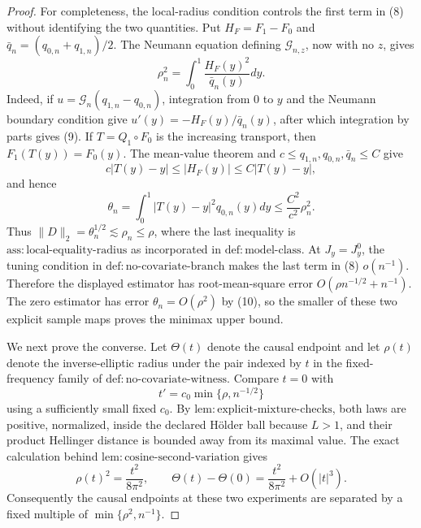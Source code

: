\documentclass{article}
\begin{document}
\begin{proof}
For completeness, the local-radius condition controls the first term in (8) without identifying the two quantities. Put \(H_F=F_1-F_0\) and \(\bar q_n=(q_{0,n}+q_{1,n})/2\). The Neumann equation defining \(\mathcal G_{n,z}\), now with no \(z\), gives
\[
\rho_n^2=\int_0^1\frac{H_F(y)^2}{\bar q_n(y)}dy. \tag{9}
\]
Indeed, if \(u=\mathcal G_n(q_{1,n}-q_{0,n})\), integration from \(0\) to \(y\) and the Neumann boundary condition give \(u'(y)=-H_F(y)/\bar q_n(y)\), after which integration by parts gives (9). If \(T=Q_1\circ F_0\) is the increasing transport, then \(F_1(T(y))=F_0(y)\). The mean-value theorem and \(c\le q_{1,n},q_{0,n},\bar q_n\le C\) give
\[
c|T(y)-y|\le|H_F(y)|\le C|T(y)-y|,
\]
and hence
\[
\theta_n=\int_0^1|T(y)-y|^2q_{0,n}(y)dy
\le \frac{C^2}{c^2}\rho_n^2. \tag{10}
\]
Thus \(\|D\|_2=\theta_n^{1/2}\lesssim\rho_n\le\rho\), where the last inequality is \(\mathrm{ass{:}local\text{-}equality\text{-}radius}\) as incorporated in \(\mathrm{def{:}model\text{-}class}\). At \(J_y=J_y^0\), the tuning condition in \(\mathrm{def{:}no\text{-}covariate\text{-}branch}\) makes the last term in (8) \(o(n^{-1})\). Therefore the displayed estimator has root-mean-square error \(O(\rho n^{-1/2}+n^{-1})\). The zero estimator has error \(\theta_n=O(\rho^2)\) by (10), so the smaller of these two explicit sample maps proves the minimax upper bound.

We next prove the converse. Let \(\Theta(t)\) denote the causal endpoint and let \(\rho(t)\) denote the inverse-elliptic radius under the pair indexed by \(t\) in the fixed-frequency family of \(\mathrm{def{:}no\text{-}covariate\text{-}witness}\). Compare \(t=0\) with
\[
t'=c_0\min\{\rho,n^{-1/2}\}
\]
using a sufficiently small fixed \(c_0\). By \(\mathrm{lem{:}explicit\text{-}mixture\text{-}checks}\), both laws are positive, normalized, inside the declared H\"older ball because \(L>1\), and their product Hellinger distance is bounded away from its maximal value. The exact calculation behind \(\mathrm{lem{:}cosine\text{-}second\text{-}variation}\) gives
\[
\rho(t)^2=\frac{t^2}{8\pi^2},
\qquad
\Theta(t)-\Theta(0)=\frac{t^2}{8\pi^2}+O(|t|^3). \tag{11}
\]
Consequently the causal endpoints at these two experiments are separated by a fixed multiple of \(\min\{\rho^2,n^{-1}\}\).


\end{proof}
\end{document}
